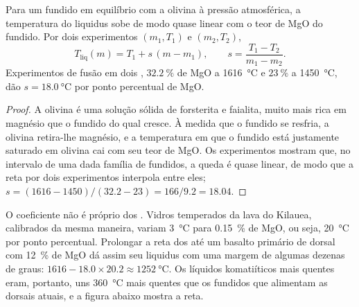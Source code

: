 \begin{proposition}\label{prop:b2:precambrian-earth:liquidus}
Para um fundido em equilíbrio com a olivina à pressão atmosférica, a temperatura do liquidus sobe
de modo quase linear com o teor de MgO do fundido. Por dois experimentos $(m_1, T_1)$ e
$(m_2, T_2)$,
\[
  T_{\text{liq}}(m) = T_1 + s\,(m - m_1), \qquad s = \frac{T_1 - T_2}{m_1 - m_2} .
\]
Experimentos de fusão em dois , $\qty{32.2}{\percent}$ de MgO a \qty{1616}{\celsius} e
$\qty{23}{\percent}$ a \qty{1450}{\celsius}, dão $s = \qty{18.0}{\celsius}$ por ponto percentual de
MgO.
\end{proposition}

\begin{proof}
A olivina é uma solução sólida de forsterita e faialita, muito mais rica em magnésio que o fundido
do qual cresce. À medida que o fundido se resfria, a olivina retira-lhe magnésio, e a temperatura em
que o fundido está justamente saturado em olivina cai com seu teor de MgO. Os experimentos mostram que,
no intervalo de uma dada família de fundidos, a queda é quase linear, de modo que a reta por
dois experimentos interpola entre eles; $s = (1616 - 1450)/(32.2 - 23) = 166/9.2 = 18.04$.
\end{proof}

O coeficiente não é próprio dos . Vidros temperados da lava do Kilauea,
calibrados da mesma maneira, variam \qty{3}{\celsius} para \qty{0.15}{\percent} de MgO, ou
seja, \qty{20}{\celsius} por ponto percentual. Prolongar a reta dos  até um basalto primário de dorsal
com \qty{12}{\percent} de MgO dá assim seu liquidus com uma margem de algumas dezenas de graus: $1616 -
18.0\times20.2 \approx \qty{1252}{\celsius}$. Os líquidos komatiíticos mais quentes eram, portanto,
uns \qty{360}{\celsius} mais quentes que os fundidos que alimentam as dorsais atuais, e a figura abaixo
mostra a reta.

